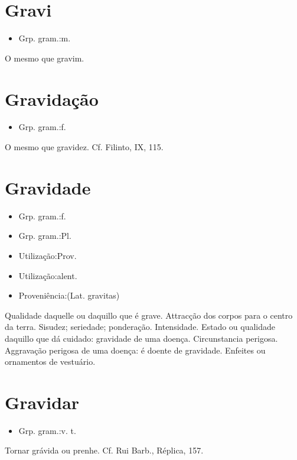 \section{Gravi}
\begin{itemize}
\item {Grp. gram.:m.}
\end{itemize}
O mesmo que \textunderscore gravim\textunderscore .
\section{Gravidação}
\begin{itemize}
\item {Grp. gram.:f.}
\end{itemize}
O mesmo que \textunderscore gravidez\textunderscore . Cf. Filinto, IX, 115.
\section{Gravidade}
\begin{itemize}
\item {Grp. gram.:f.}
\end{itemize}
\begin{itemize}
\item {Grp. gram.:Pl.}
\end{itemize}
\begin{itemize}
\item {Utilização:Prov.}
\end{itemize}
\begin{itemize}
\item {Utilização:alent.}
\end{itemize}
\begin{itemize}
\item {Proveniência:(Lat. \textunderscore gravitas\textunderscore )}
\end{itemize}
Qualidade daquelle ou daquillo que é grave.
Attracção dos corpos para o centro da terra.
Sisudez; seriedade; ponderação.
Intensidade.
Estado ou qualidade daquillo que dá cuidado: \textunderscore gravidade de uma doença\textunderscore .
Circunstancia perigosa.
Aggravação perigosa de uma doença: \textunderscore é doente de gravidade\textunderscore .
Enfeites ou ornamentos de vestuário.
\section{Gravidar}
\begin{itemize}
\item {Grp. gram.:v. t.}
\end{itemize}
Tornar grávida ou prenhe. Cf. Rui Barb., \textunderscore Réplica\textunderscore , 157.
